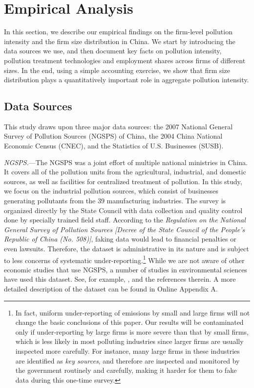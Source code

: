 \documentclass[AEJ]{AEA}
\begin{document}
\section{Empirical Analysis}

In this section, we describe our empirical findings on the firm-level pollution intensity and the firm size distribution in China. We start by introducing the data sources we use, and then document key facts on pollution intensity, pollution treatment technologies and employment shares across firms of different sizes. In the end, using a simple accounting exercise, we show that firm size distribution plays a quantitatively important role in aggregate pollution intensity.

\subsection{Data Sources}
\label{sec:data_source}

This study draws upon three major data sources: the 2007 National General Survey of Pollution Sources (NGSPS) of China, the 2004 China National Economic Census (CNEC), and the Statistics of U.S. Businesses (SUSB).

\textit{NGSPS.}---The NGSPS was a joint effort of multiple national ministries in China. It covers all of the pollution units from the agricultural, industrial, and domestic sources, as well as facilities for centralized treatment of pollution. In this study, we focus on the {industrial pollution sources}, which consist of businesses generating pollutants from the 39 manufacturing industries. The survey is organized directly by the State Council with data collection and quality control done by specially trained field staff. According to the \textit{Regulation on the National General Survey of Pollution Sources [Decree of the State Council of the People's Republic of China (No. 508)]}, faking data would lead to financial penalties or even lawsuits. Therefore, the dataset is administrative in its nature and is subject to less concerns of systematic under-reporting.\footnote{In fact, uniform under-reporting of emissions by small and large firms will not change the basic conclusions of this paper. Our results will be contaminated only if under-reporting by large firms is more severe than that by small firms, which is less likely in most polluting industries since larger firms are usually inspected more carefully. For instance, many large firms in these industries are identified as \textit{key sources}, and therefore are inspected and monitored by the government routinely and carefully, making it harder for them to fake data during this one-time survey.} While we are not aware of other economic studies that use NGSPS, a number of studies in environmental sciences have used this dataset. See, for example, \citet{Niuetal:2016}, \citet{Qietal:2017} and the references therein. A more detailed description of the dataset can be found in Online Appendix A.
\end{document}
